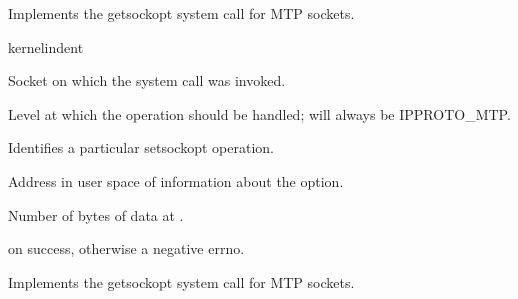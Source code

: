 \documentclass[letterpaper,10pt,english]{sphinxmanual}
\begin{document}
\begin{fulllineitems}
\label{\detokenize{mtpimpl.c:c.MTP_setsockopt}}
\pysigstartsignatures
\pysigstartmultiline
{}
\pysigstopmultiline
\pysigstopsignatures
\sphinxAtStartPar
Implements the getsockopt system call for MTP sockets.

\end{fulllineitems}


\begin{sphinxuseclass}{kernelindent}
\sphinxAtStartPar
{}
\begin{description}
\sphinxAtStartPar
Socket on which the system call was invoked.

\sphinxAtStartPar
Level at which the operation should be handled; will always
be IPPROTO\_MTP.

\sphinxAtStartPar
Identifies a particular setsockopt operation.

\sphinxAtStartPar
Address in user space of information about the option.

\sphinxAtStartPar
Number of bytes of data at .

\end{description}

\sphinxAtStartPar
{}

 on success, otherwise a negative errno.

\end{sphinxuseclass}

\begin{fulllineitems}

\pysigstartsignatures
{}
\pysigstopsignatures
\sphinxAtStartPar
Implements the getsockopt system call for MTP sockets.

\end{fulllineitems}
\end{document}
